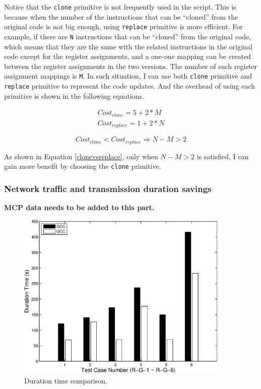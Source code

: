Notice that the {\tt clone} primitive is not frequently used in the script. This is because when the number of the instructions that can be ``cloned'' from the original code is not big enough, using {\tt replace} primitive is more efficient. For example, if there are {\tt N} instructions that can be ``cloned'' from the original code, which means that they are the same with the related instructions in the original code except for the register assignments, and a one-one mapping can be created between the register assignments in the two versions. The number of such register assignment mappings is {\tt M}. 
In such situation, I can use both {\tt clone} primitive and {\tt replace} primitive to represent the code updates. And the overhead of using each primitive is shown in the following equations.
\begin{small}
\begin{eqnarray}
Cost_{clone} = 5 + 2*M\\
Cost_{replace} = 1 + 2*N
\end{eqnarray}
\end{small}

\begin{small}
\begin{equation}
Cost_{clone} < Cost_{replace} \Rightarrow N-M > 2
\label{clonevsreplace}
\end{equation}
\end{small}

As shown in Equation \ref{clonevsreplace}, only when $N-M > 2$ is satisfied, I can gain more benefit by choosing the {\tt clone} primitive.


\subsubsection{Network traffic and transmission duration savings}

\textbf{MCP data needs to be added to this part.}

\begin{figure}[htp]
\centering
\includegraphics[width=4in]{figures/time.eps}
\caption{Duration time comparison.}
\label{fig:case.time}
\end{figure}

